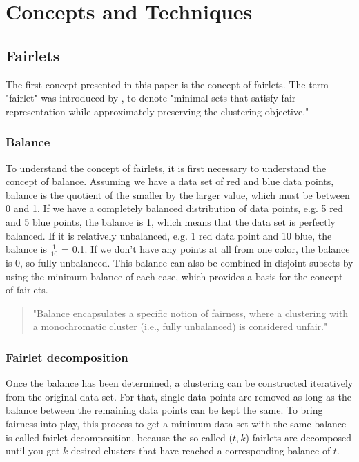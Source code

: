 \section{Concepts and Techniques}


\subsection{Fairlets}
\label{fairlets}

The first concept presented in this paper is the concept of fairlets. The term "fairlet" was introduced by  \textcite[]{Chierichetti2018}, to denote "minimal sets that satisfy fair representation
while approximately preserving the clustering objective." \autocite[1]{Chierichetti2018} 

\subsubsection{Balance}

To understand the concept of fairlets, it is first necessary to understand the concept of balance. Assuming we have a data set of red and blue data points, balance is the quotient of the smaller by the larger value, which must be between 0 and 1. If we have a completely balanced distribution of data points, e.g. 5 red and 5 blue points, the balance is 1, which means that the data set is perfectly balanced. If it is relatively unbalanced, e.g. 1 red data point and 10 blue, the balance is $\frac{1}{10}$ = 0.1. If we don't have any points at all from one color, the balance is 0, so fully unbalanced. This balance can also be combined in disjoint subsets by using the minimum balance of each case, which provides a basis for the concept of fairlets. \autocite[4]{Chierichetti2018}

\begin{quote}
"Balance encapsulates a specific notion of fairness, where a clustering with a monochromatic cluster (i.e., fully unbalanced) is considered unfair."

\autocite[4]{Chierichetti2018}
\end{quote}

\subsubsection{Fairlet decomposition}

Once the balance has been determined, a clustering can be constructed iteratively from the original data set. For that, single data points are removed as long as the balance between the remaining data points can be kept the same. To bring fairness into play, this process to get a minimum data set with the same balance is called fairlet decomposition, because the so-called ($t, k$)-fairlets are decomposed until you get $k$ desired clusters that have reached a corresponding balance of $t$. \autocite[4]{Chierichetti2018}

